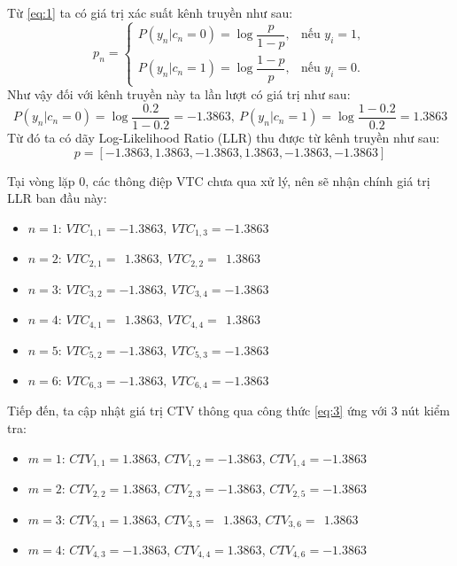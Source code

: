 \documentclass[12pt,a4paper,oneside]{book}
\begin{document}
Từ \ref{eq:1} ta có giá trị xác suất kênh truyền như sau:
\begin{equation}
    p_n = \begin{cases} 
P(y_n|c_n=0)=\log \dfrac{p}{1-p}, & \text{nếu } y_i = 1, \\
P(y_n|c_n=1)=\log \dfrac{1-p}{p}, & \text{nếu } y_i = 0.
\end{cases}
\end{equation}
Như vậy đối với kênh truyền này ta lần lượt có giá trị như sau:
\begin{equation}
    P(y_n|c_n=0) = \log \frac{0.2}{1-0.2} = -1.3863,\ P(y_n|c_n=1) = \log \frac{1-0.2}{0.2} = 1.3863
\end{equation}
Từ đó ta có dãy Log-Likelihood Ratio (LLR) thu được từ kênh truyền như sau:
\begin{equation}
    p = [-1.3863, 1.3863, -1.3863, 1.3863, -1.3863, -1.3863]
\end{equation}

Tại vòng lặp 0, các thông điệp VTC chưa qua xử lý, nên sẽ nhận chính giá trị LLR ban đầu này:
\begin{itemize}
    \item[]$n = 1$: $VTC_{1,1} = -1.3863,\ VTC_{1,3} = -1.3863$
    \item[]$n = 2$: $VTC_{2,1} =\ \ 1.3863,\ VTC_{2,2} =\ \ 1.3863$
    \item[]$n = 3$: $VTC_{3,2} = -1.3863,\ VTC_{3,4} = -1.3863$
    \item[]$n = 4$: $VTC_{4,1} =\ \ 1.3863,\ VTC_{4,4} =\ \ 1.3863$
    \item[]$n = 5$: $VTC_{5,2} = -1.3863,\ VTC_{5,3} = -1.3863$
    \item[]$n = 6$: $VTC_{6,3} = -1.3863,\ VTC_{6,4}= -1.3863$
\end{itemize}

Tiếp đến, ta cập nhật giá trị CTV thông qua công thức \ref{eq:3} ứng với 3 nút kiểm tra:
\begin{itemize}
    \item[]$m = 1$: $CTV_{1,1} = 1.3863$, $CTV_{1,2} = -1.3863$, $CTV_{1,4} = -1.3863$
    \item[]$m = 2$: $CTV_{2,2} = 1.3863$, $CTV_{2,3} = -1.3863$, $CTV_{2,5} = -1.3863$
    \item[]$m = 3$: $CTV_{3,1} = 1.3863$, $CTV_{3,5} =\ \ 1.3863$, $CTV_{3,6} =\ \ 1.3863$
    \item[]$m = 4$: $CTV_{4,3} = -1.3863$, $CTV_{4,4} = 1.3863$, $CTV_{4,6} = -1.3863$
\end{itemize}
\end{document}
